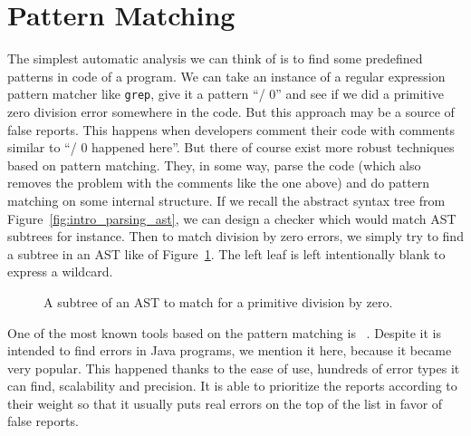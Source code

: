 

\section{Pattern Matching}\label{sec:pattern_matching}
The simplest automatic analysis we can think of is to find some predefined
patterns in code of a program.  We can take an instance of a regular
expression pattern matcher like \texttt{grep}, give it a pattern ``/ 0'' and
see if we did a primitive zero division error somewhere in the code. But this
approach may be a source of false reports. This happens when developers
comment their code with comments similar to ``/ 0 happened here''.  But there
of course exist more robust techniques based on pattern matching.  They, in
some way, parse the code (which also removes the problem with the comments
like the one above) and do pattern matching on some internal structure. If we
recall the abstract syntax tree from Figure~\ref{fig:intro_parsing_ast}, we
can design a checker which would match AST subtrees for instance. Then to
match division by zero errors, we simply try to find a subtree in an AST like
of Figure~\ref{fig:ast_to_match}.  The left leaf is left intentionally blank
to express a wildcard.
\begin{figure}[h]
\begin{center}
\end{center}
    \caption{A subtree of an AST to match for a primitive division by zero.}
  \label{fig:ast_to_match}
\end{figure}

One of the most known tools based on the pattern matching is
\fbugs~\cite{findbugs}. Despite it is intended to find errors in Java
programs, we mention it here, because it became very popular. This happened
thanks to the ease of use, hundreds of error types it can find, scalability
and precision. It is able to prioritize the reports according to their weight
so that it usually puts real errors on the top of the list in favor of false
reports.

